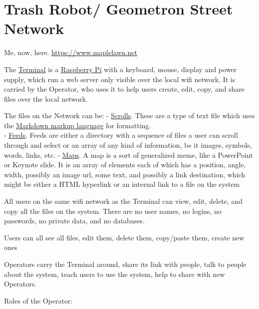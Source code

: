 \section{Trash Robot/ Geometron Street
Network}\label{trash-robot-geometron-street-network}

Me, now, here. \url{https://www.maplelawn.net}

The \href{scrolls/terminal.md}{Terminal} is a
\href{https://www.raspberrypi.org/}{Raspberry Pi} with a keyboard,
mouse, display and power supply, which run a web server only visible
over the local wifi network. It is carried by the Operator, who uses it
to help users create, edit, copy, and share files over the local
network.

The files on the Network can be: - \href{scrolls/scrolls.md}{Scrolls}.
These are a type of text file which uses the
\href{https://daringfireball.net/projects/markdown/}{Markdown markup
language} for formatting.\\
- \href{scrolls/feeds.md}{Feeds}. Feeds are either a directory with a
sequence of files a user can scroll through and select or an array of
any kind of information, be it images, symbols, words, links, etc. -
\href{scrolls/maps.md}{Maps}. A map is a sort of generalized meme, like
a PowerPoint or Keynote slide. It is an array of elements each of which
has a position, angle, width, possibly an image url, some text, and
possibly a link destination, which might be either a HTML hyperlink or
an internal link to a file on the system

All users on the same wifi network as the Terminal can view, edit,
delete, and copy all the files on the system. There are no user names,
no logins, no passwords, no private data, and no databases.

Users can all see all files, edit them, delete them, copy/paste them,
create new ones

Operators carry the Terminal around, share its link with people, talk to
people about the system, teach users to use the system, help to share
with new Operators.

Roles of the Operator:

